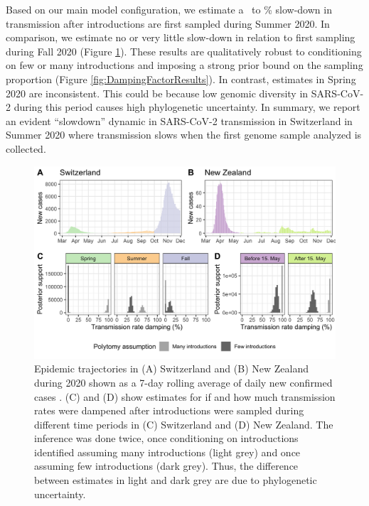 \documentclass[9pt,twoside,lineno]{pnas-new} %
\begin{document}
Based on our main model configuration, we estimate a \summermaxdampingpercentmedianCHEnosampUB\ to \summermindampingpercentmedianCHEnosampUB\% slow-down in transmission after introductions are first sampled during Summer 2020. In comparison, we estimate no or very little slow-down in relation to first sampling during Fall 2020 (Figure \ref{fig:scale-factor}). These results are qualitatively robust to conditioning on few or many introductions and imposing a strong prior bound on the sampling proportion (Figure \ref{fig:DampingFactorResults}). In contrast, estimates in Spring 2020 are inconsistent. This could be because low genomic diversity in SARS-CoV-2 during this period causes high phylogenetic uncertainty. In summary, we report an evident ``slowdown'' dynamic in SARS-CoV-2 transmission in Switzerland in Summer 2020 where transmission slows when the first genome sample analyzed is collected.

\begin{figure}[h!]
\centering
\includegraphics[width=0.75\linewidth]{figures/contact_tracing_factors_no_sampUB_compared_to_cases.png}
\caption{Epidemic trajectories in (A) Switzerland and (B) New Zealand during 2020 shown as a 7-day rolling average of daily new confirmed cases \cite{Appel}. (C) and (D) show estimates for if and how much transmission rates were dampened after introductions were sampled during different time periods in (C) Switzerland and (D) New Zealand. The inference was done twice, once conditioning on introductions identified assuming many introductions (light grey) and once assuming few introductions (dark grey). Thus, the difference between estimates in light and dark grey are due to phylogenetic uncertainty.}  
\label{fig:scale-factor}
\end{figure}
\end{document}
